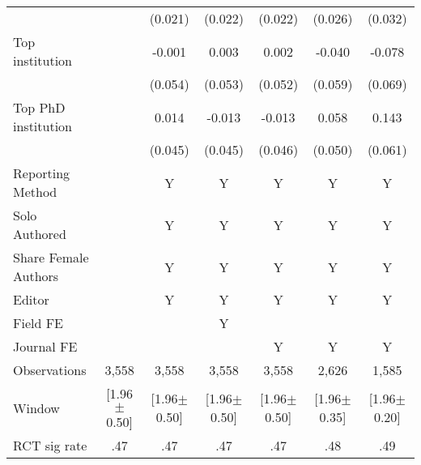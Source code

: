 {\begin{tabular}{l*{6}{c}}
                &                  &  (0.021)         &  (0.022)         &  (0.022)         &  (0.026)         &  (0.032)         \\
Top institution &                  &   -0.001         &    0.003         &    0.002         &   -0.040         &   -0.078         \\
                &                  &  (0.054)         &  (0.053)         &  (0.052)         &  (0.059)         &  (0.069)         \\
Top PhD institution&                  &    0.014         &   -0.013         &   -0.013         &    0.058         &    0.143\sym{**} \\
                &                  &  (0.045)         &  (0.045)         &  (0.046)         &  (0.050)         &  (0.061)         \\
Reporting Method &                  &        Y         &        Y         &        Y         &        Y         &        Y         \\
Solo Authored   &                  &        Y         &        Y         &        Y         &        Y         &        Y         \\
Share Female Authors &                  &        Y         &        Y         &        Y         &        Y         &        Y         \\
Editor          &                  &        Y         &        Y         &        Y         &        Y         &        Y         \\
Field FE        &                  &                  &        Y         &                  &                  &                  \\
Journal FE      &                  &                  &                  &        Y         &        Y         &        Y         \\
\hline
Observations    &    3,558         &    3,558         &    3,558         &    3,558         &    2,626         &    1,585         \\
Window          &[1.96$\pm$0.50]         &[1.96$\pm$0.50]         &[1.96$\pm$0.50]         &[1.96$\pm$0.50]         &[1.96$\pm$0.35]         &[1.96$\pm$0.20]         \\
RCT sig rate    &      .47         &      .47         &      .47         &      .47         &      .48         &      .49         \\
\hline\hline
\end{tabular}
}
